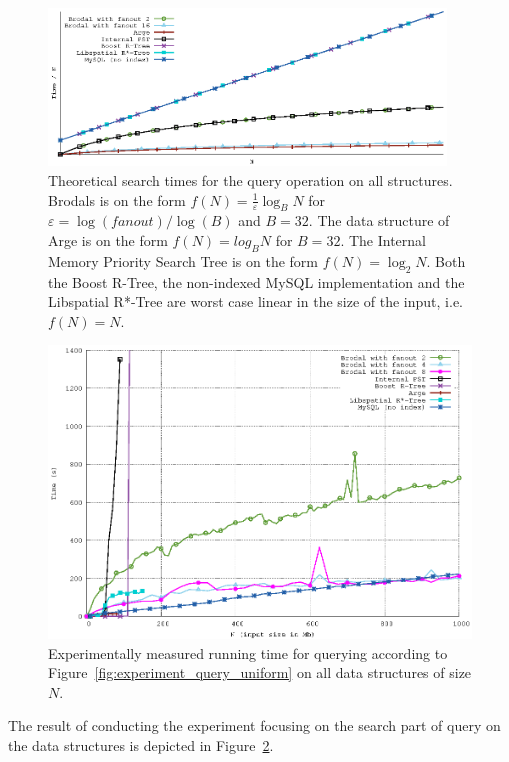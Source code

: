 \documentclass[twoside,11pt,openright]{report}
\def \epsilon {\varepsilon}
\begin{document}
\begin{figure}[h]
\centering
\includegraphics[width=0.94\textwidth]{../plots/query_complexities/query_complexity}
\caption{Theoretical search times for the query operation on all structures. Brodals is on the form $f(N) = \frac{1}{\epsilon}\log_B N$ for $\epsilon = \log(fanout) / \log(B)$ and $B = 32$. The data structure of Arge is on the form $f(N) = log_B N$ for $B = 32$. The Internal Memory Priority Search Tree is on the form $f(N) = \log_2 N$. Both the Boost R-Tree, the non-indexed MySQL implementation and the Libspatial R*-Tree are worst case linear in the size of the input, i.e. $f(N) = N$.}
\label{fig:theory_query_complexity}
\end{figure}

\begin{figure}[h]
\centering
\includegraphics[width=\textwidth]{../src/experiments/query_experiment_results/final2/time}
\caption{Experimentally measured running time for querying according to Figure~\ref{fig:experiment_query_uniform} on all data structures of size $N$.}
\label{fig:result_query_search_complexity}
\end{figure}

The result of conducting the experiment focusing on the search part of query on the data structures is depicted in Figure~\ref{fig:result_query_search_complexity}.
\end{document}
